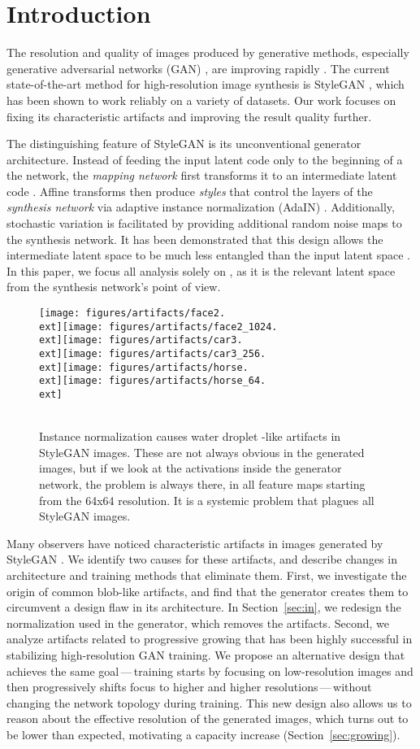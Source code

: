 \documentclass[10pt,twocolumn,letterpaper]{article}
\newcommand{\ext}{jpg}  \else
\newcommand{\ext}{jpg}
\newcommand{\h}{0mm}
\newcommand{\figdroplets}{
\begin{figure*}[t]
\renewcommand{\h}{0.163\linewidth}
\texttt{[image: figures/artifacts/face2.\\ext]}\hfill \texttt{[image: figures/artifacts/face2\_1024.\\ext]}\hfill\hfill\hfill \texttt{[image: figures/artifacts/car3.\\ext]}\hfill \texttt{[image: figures/artifacts/car3\_256.\\ext]}\hfill\hfill\hfill \texttt{[image: figures/artifacts/horse.\\ext]}\hfill \texttt{[image: figures/artifacts/horse\_64.\\ext]}\\
\makebox[\h]{\hspace{-4.5mm}\raisebox{29.5mm}[0mm][0mm]{\begin{tikzpicture}\draw[red,thick] (0,0) circle (2.5mm);\end{tikzpicture}}}\hfill \makebox[\h]{\hspace{-4.5mm}\raisebox{29.5mm}[0mm][0mm]{\begin{tikzpicture}\draw[red,thick] (0,0) circle (2.5mm);\end{tikzpicture}}}\hfill\hfill\hfill \makebox[\h]{\hspace{5.4mm}\raisebox{22.5mm}[0mm][0mm]{\begin{tikzpicture}\draw[red,thick] (0,0) circle (3.5mm);\end{tikzpicture}}}\hfill \makebox[\h]{\hspace{5.4mm}\raisebox{22.5mm}[0mm][0mm]{\begin{tikzpicture}\draw[red,thick] (0,0) circle (3.5mm);\end{tikzpicture}}}\hfill\hfill\hfill \makebox[\h]{\hspace{24.5mm}\raisebox{25.5mm}[0mm][0mm]{\begin{tikzpicture}\draw[red,thick] (0,0) circle (4mm);\end{tikzpicture}}}\hfill \makebox[\h]{\hspace{24.5mm}\raisebox{25.5mm}[0mm][0mm]{\begin{tikzpicture}\draw[red,thick] (0,0) circle (4mm);\end{tikzpicture}}}\\\vspace{-1.5\baselineskip}
\caption{Instance normalization causes water droplet -like artifacts in StyleGAN images. These are not always obvious in the generated images, but if we look at the activations inside the generator network, the problem is always there, in all feature maps starting from the 64x64 resolution. It is a systemic problem that plagues all StyleGAN images.
}
\label{fig:droplets}
\end{figure*}
}
\begin{document}
\section{Introduction}

The resolution and quality of images produced by generative methods, especially generative adversarial networks (GAN) \cite{Goodfellow2014}, are improving rapidly \cite{Karras2017,Miyato2018B,Brock2018}. 
The current state-of-the-art method for high-resolution image synthesis is StyleGAN \cite{Karras2018}, which has been shown to work reliably on a variety of datasets. 
Our work focuses on fixing its characteristic artifacts and improving the result quality further.

The distinguishing feature of StyleGAN \cite{Karras2018} is its unconventional generator architecture. Instead of feeding the input latent code  only to the beginning of a the network, the \emph{mapping network}  first transforms it to an intermediate latent code .
Affine transforms then produce \emph{styles} that control the layers of the \emph{synthesis network}  via adaptive instance normalization (AdaIN) \cite{Huang2017,Dumoulin2016,Ghiasi2017,Dumoulin2018}.
Additionally, stochastic variation is facilitated by providing additional random noise maps to the synthesis network.
It has been demonstrated \cite{Karras2018,Shen2019} that this design allows the intermediate latent space  to be much less entangled than the input latent space .
In this paper, we focus all analysis solely on , as it is the relevant latent space from the synthesis network's point of view.

\figdroplets 
Many observers have noticed characteristic artifacts in images generated by StyleGAN \cite{Bergstrom2019}. We identify two causes for these artifacts, and describe changes in architecture and training methods that eliminate them.
First, we investigate the origin of common blob-like artifacts, and find that the generator creates them to circumvent a design flaw in its architecture. 
In Section~\ref{sec:in}, we redesign the normalization used in the generator, which removes the artifacts.
Second, we analyze artifacts related to progressive growing \cite{Karras2017} that has been highly successful in stabilizing high-resolution GAN training.
We propose an alternative design that achieves the same goal\,---\,training starts by focusing on
low-resolution images and then progressively shifts focus to higher and higher resolutions\,---\,without changing the network topology during training.
This new design also allows us to reason about the effective resolution of the generated images, which turns out to be lower than expected, motivating a capacity increase (Section~\ref{sec:growing}).
\end{document}
